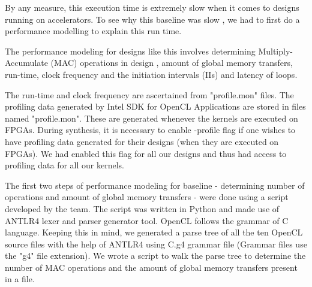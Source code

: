 By any measure, this execution time is extremely slow when it comes to designs running on accelerators. To see why this baseline was slow , we had to first do a performance modelling to explain this run time.

The performance modeling for designs like this involves determining
  Multiply-Accumulate (MAC) operations in design , amount of global memory transfers, run-time, clock frequency and the initiation intervals (IIs) and latency of loops.

The run-time and clock frequency are ascertained from "profile.mon" files.   
The profiling data generated by Intel SDK for OpenCL Applications are stored in files named "profile.mon". These are generated whenever the kernels are executed on FPGAs. During synthesis, it is necessary to enable -profile flag if one wishes to have profiling data generated for their designs (when they are executed on FPGAs). We had enabled this flag for all our designs and thus had access to profiling data for all our kernels.

The first two steps of performance modeling for baseline - determining number of operations and amount of global memory transfers - were done using a script developed by the team. The script was written in Python and made use of ANTLR4 lexer and parser generator tool. OpenCL follows the grammar of C language. Keeping this in mind, we generated a parse tree of all the ten OpenCL source files with the help of ANTLR4 using C.g4 grammar file (Grammar files use the "g4" file extension). We wrote a script to walk the parse tree to determine the number of MAC operations and the amount of global memory transfers present in a file.

